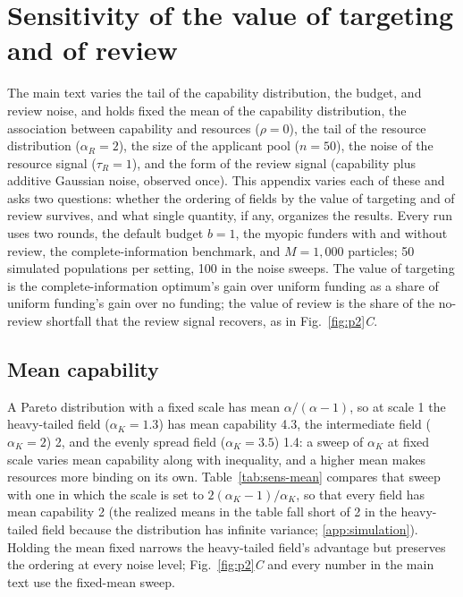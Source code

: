 \section{Sensitivity of the value of targeting and of review}\label{app:sensitivity}\label{si:sensitivity}

The main text varies the tail of the capability distribution, the budget, and review noise, and holds fixed the mean of the capability distribution, the association between capability and resources ($\rho = 0$), the tail of the resource distribution ($\alpha_R = 2$), the size of the applicant pool ($n = 50$), the noise of the resource signal ($\tau_R = 1$), and the form of the review signal (capability plus additive Gaussian noise, observed once). This appendix varies each of these and asks two questions: whether the ordering of fields by the value of targeting and of review survives, and what single quantity, if any, organizes the results. Every run uses two rounds, the default budget $b = 1$, the myopic funders with and without review, the complete-information benchmark, and $M = 1{,}000$ particles; 50 simulated populations per setting, 100 in the noise sweeps. The value of targeting is the complete-information optimum's gain over uniform funding as a share of uniform funding's gain over no funding; the value of review is the share of the no-review shortfall that the review signal recovers, as in Fig.~\ref{fig:p2}\textit{C}.

\subsection*{Mean capability}
A Pareto distribution with a fixed scale has mean $\alpha/(\alpha - 1)$, so at scale 1 the heavy-tailed field ($\alpha_K = 1.3$) has mean capability 4.3, the intermediate field ($\alpha_K = 2$) 2, and the evenly spread field ($\alpha_K = 3.5$) 1.4: a sweep of $\alpha_K$ at fixed scale varies mean capability along with inequality, and a higher mean makes resources more binding on its own. Table~\ref{tab:sens-mean} compares that sweep with one in which the scale is set to $2(\alpha_K - 1)/\alpha_K$, so that every field has mean capability 2 (the realized means in the table fall short of 2 in the heavy-tailed field because the distribution has infinite variance; \ref{app:simulation}). Holding the mean fixed narrows the heavy-tailed field's advantage but preserves the ordering at every noise level; Fig.~\ref{fig:p2}\textit{C} and every number in the main text use the fixed-mean sweep.

